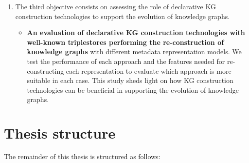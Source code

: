\begin{enumerate}
    \item The third objective consists on assessing the role of declarative KG construction technologies to support the evolution of knowledge graphs.

    \begin{itemize}
        \item \textbf{An evaluation of declarative KG construction technologies with well-known triplestores performing the re-construction of knowledge graphs} with different metadata representation models. We test the performance of each approach and the features needed for re-constructing each representation to evaluate which approach is more suitable in each case. This study sheds light on how KG construction technologies can be beneficial in supporting the evolution of knowledge graphs.
    \end{itemize}
\end{enumerate}


\section{Thesis structure}

The remainder of this thesis is structured as follows:

